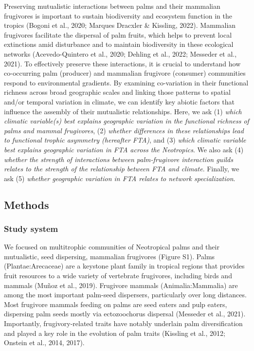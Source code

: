 \documentclass[
]{agujournal2019}
\begin{document}
Preserving mutualistic interactions between palms and their mammalian
frugivores is important to sustain biodiversity and ecosystem function
in the tropics (Bogoni et al., 2020; Marques Dracxler \& Kissling,
2022). Mammalian frugivores facilitate the dispersal of palm fruits,
which helps to prevent local extinctions amid disturbance and to
maintain biodiversity in these ecological networks (Acevedo-Quintero et
al., 2020; Dehling et al., 2022; Messeder et al., 2021). To effectively
preserve these interactions, it is crucial to understand how
co-occurring palm (producer) and mammalian frugivore (consumer)
communities respond to environmental gradients. By examining
co-variation in their functional richness across broad geographic scales
and linking those patterns to spatial and/or temporal variation in
climate, we can identify key abiotic factors that influence the assembly
of their mutualistic relationships. Here, we ask (1) \emph{which
climatic variable(s) best explains geographic variation in the
functional richness of palms and mammal frugivores}, (2) \emph{whether
differences in these relationships lead to functional trophic asymmetry
(hereafter FTA)}, and (3) \emph{which climatic variable best explains
geographic variation in FTA across the Neotropics}. We also ask (4)
\emph{whether the strength of interactions between palm-frugivore
interaction guilds relates to the strength of the relationship between
FTA and climate}. Finally, we ask (5) \emph{whether geographic variation
in FTA relates to network specialization}.

\subsection{Methods}\label{methods}

\subsubsection{Study system}\label{study-system}

We focused on multitrophic communities of Neotropical palms and their
mutualistic, seed dispersing, mammalian frugivores (Figure S1). Palms
(Plantae:Arecaceae) are a keystone plant family in tropical regions that
provides fruit resources to a wide variety of vertebrate frugivores,
including birds and mammals (Muñoz et al., 2019). Frugivore mammals
(Animalia:Mammalia) are among the most important palm-seed dispersers,
particularly over long distances. Most frugivore mammals feeding on
palms are seed eaters and pulp eaters, dispersing palm seeds mostly via
ectozoochorus dispersal (Messeder et al., 2021). Importantly,
frugivory-related traits have notably underlain palm diversification and
played a key role in the evolution of palm traits (Kissling et al.,
2012; Onstein et al., 2014, 2017).
\end{document}
